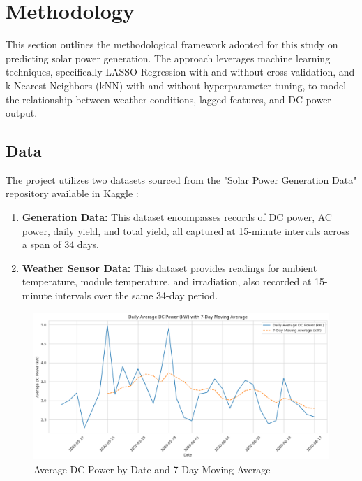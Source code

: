 \section{Methodology}

This section outlines the methodological framework adopted for this study on predicting solar power generation. The approach leverages machine learning techniques, specifically LASSO Regression with and without cross-validation, and k-Nearest Neighbors (kNN) with and without hyperparameter tuning, to model the relationship between weather conditions, lagged features, and DC power output. 

\subsection{Data}

The project utilizes two datasets sourced from the "Solar Power Generation Data" repository available in Kaggle \cite{solar-kaggle}:

\begin{enumerate}
   \item \textbf{Generation Data:} This dataset encompasses records of DC power, AC power, daily yield, and total yield, all captured at 15-minute intervals across a span of 34 days.
   \item \textbf{Weather Sensor Data:} This dataset provides readings for ambient temperature, module temperature, and irradiation, also recorded at 15-minute intervals over the same 34-day period.
\end{enumerate} 

\begin{figure}[!htpb]
    \centering
    \includegraphics[width=\linewidth]{Figures/dc_by_date_f.png}
    \caption{Average DC Power by Date and 7-Day Moving Average}
    \label{fig:dc_by_date}
\end{figure}

